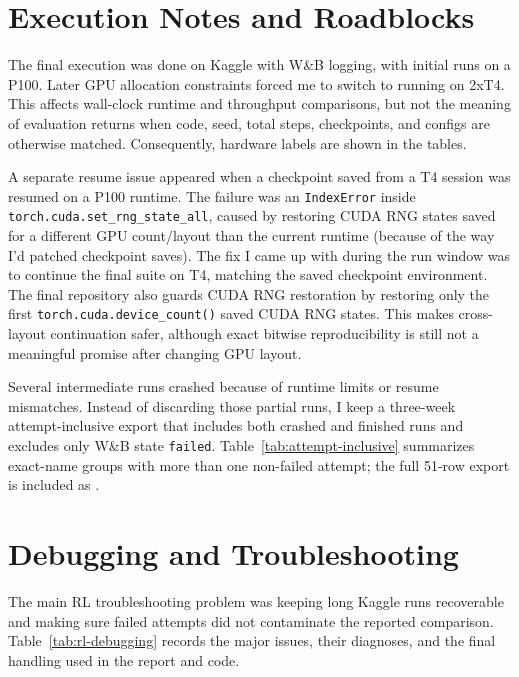 \documentclass[11pt]{article}
\begin{document}
\section{Execution Notes and Roadblocks}

The final execution was done on Kaggle with W\&B logging, with initial runs on a P100. Later GPU allocation constraints forced me to switch to running on 2xT4. This affects wall-clock runtime and throughput comparisons, but not the meaning of evaluation returns when code, seed, total steps, checkpoints, and configs are otherwise matched. Consequently, hardware labels are shown in the tables.

A separate resume issue appeared when a checkpoint saved from a T4 session was resumed on a P100 runtime. The failure was an \texttt{IndexError} inside \texttt{torch.cuda.set\_rng\_state\_all}, caused by restoring CUDA RNG states saved for a different GPU count/layout than the current runtime (because of the way I'd patched checkpoint saves). The fix I came up with during the run window was to continue the final suite on T4, matching the saved checkpoint environment. The final repository also guards CUDA RNG restoration by restoring only the first \texttt{torch.cuda.device\_count()} saved CUDA RNG states. This makes cross-layout continuation safer, although exact bitwise reproducibility is still not a meaningful promise after changing GPU layout.

Several intermediate runs crashed because of runtime limits or resume mismatches. Instead of discarding those partial runs, I keep a three-week attempt-inclusive export that includes both crashed and finished runs and excludes only W\&B state \texttt{failed}. Table~\ref{tab:attempt-inclusive} summarizes exact-name groups with more than one non-failed attempt; the full 51-row export is included as .

\section{Debugging and Troubleshooting}

The main RL troubleshooting problem was keeping long Kaggle runs recoverable and making sure failed attempts did not contaminate the reported comparison. Table~\ref{tab:rl-debugging} records the major issues, their diagnoses, and the final handling used in the report and code.
\end{document}
